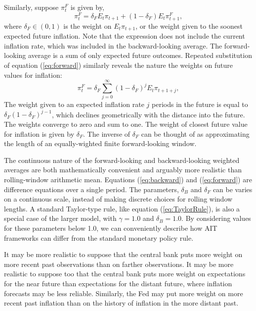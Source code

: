 \documentclass[english,authoryear,12pt]{elsarticle}
\begin{document}
Similarly, suppose $\pi_t^F$ is given by,
\begin{equation}\label{eq:forward}
	\pi_t^F = \delta_F E_t \pi_{t+1} + (1-\delta_F) E_t \pi_{t+1}^F,
\end{equation}
where $\delta_F \in (0,1)$ is the weight on $E_t \pi_{t+1}$, or the weight given to the soonest expected future inflation. Note that the expression does not include the current inflation rate, which was included in the backward-looking average. The forward-looking average is a sum of only expected future outcomes. Repeated substitution of equation (\ref{eq:forward}) similarly reveals the nature the weights on future values for inflation:
\begin{equation}\label{eq:forward_all}
	\pi_t^F = \delta_F \sum_{j=0}^{\infty} (1-\delta_F)^j E_t \pi_{t+1+j},
\end{equation}
The weight given to an expected inflation rate $j$ periods in the future is equal to $\delta_F (1-\delta_F)^{j-1}$, which declines geometrically with the distance into the future. The weights converge to zero and sum to one. The weight of closest future value for inflation is given by $\delta_F$. The inverse of $\delta_F$ can be thought of as approximating the length of an equally-wighted finite forward-looking window.

The continuous nature of the forward-looking and backward-looking weighted averages are both mathematically convenient and arguably more realistic than rolling-window arithmetic mean. Equations (\ref{eq:backward}) and (\ref{eq:forward}) are difference equations over a single period. The parameters, $\delta_B$ and $\delta_F$ can be varies on a continuous scale, instead of making discrete choices for rolling window lengths. A standard Taylor-type rule, like equation (\ref{eq:TaylorRule}), is also a special case of the larger model, with $\gamma=1.0$ and $\delta_B=1.0$. By considering values for these parameters below 1.0, we can conveniently describe how AIT frameworks can differ from the standard monetary policy rule.

It may be more realistic to suppose that the central bank puts more weight on more recent past observations than on farther observations. It may be more realistic to suppose too that the central bank puts more weight on expectations for the near future than expectations for the distant future, where inflation forecasts may be less reliable. Similarly, the Fed may put more weight on more recent past inflation than on the history of inflation in the more distant past.
\end{document}
